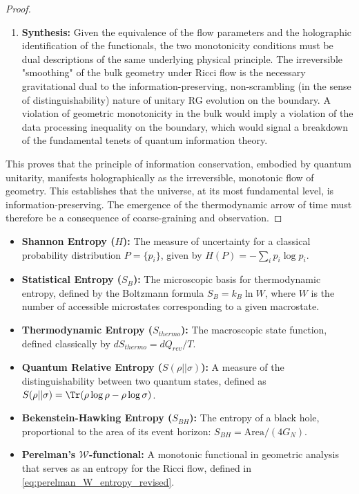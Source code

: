 \documentclass[11pt, letterpaper]{report}
\theoremstyle{plain} %
\theoremstyle{definition} %
\theoremstyle{remark} %
\begin{document}
\begin{proof}
\begin{enumerate}
    \item \textbf{Synthesis:} Given the equivalence of the flow parameters and the holographic identification of the functionals, the two monotonicity conditions must be dual descriptions of the same underlying physical principle. The irreversible "smoothing" of the bulk geometry under Ricci flow is the necessary gravitational dual to the information-preserving, non-scrambling (in the sense of distinguishability) nature of unitary RG evolution on the boundary. A violation of geometric monotonicity in the bulk would imply a violation of the data processing inequality on the boundary, which would signal a breakdown of the fundamental tenets of quantum information theory.
\end{enumerate}
This proves that the principle of information conservation, embodied by quantum unitarity, manifests holographically as the irreversible, monotonic flow of geometry. This establishes that the universe, at its most fundamental level, is information-preserving. The emergence of the thermodynamic arrow of time must therefore be a consequence of coarse-graining and observation.
\end{proof}
\begin{itemize}
    \item \textbf{Shannon Entropy ($H$):} The measure of uncertainty for a classical probability distribution $P = \{p_i\}$, given by $H(P) = -\sum_i p_i \log p_i$.
    \item \textbf{Statistical Entropy ($S_B$):} The microscopic basis for thermodynamic entropy, defined by the Boltzmann formula $S_B = k_B \ln W$, where $W$ is the number of accessible microstates corresponding to a given macrostate.
    \item \textbf{Thermodynamic Entropy ($S_{thermo}$):} The macroscopic state function, defined classically by $dS_{thermo} = dQ_{rev}/T$.
    \item \textbf{Quantum Relative Entropy ($S(\rho||\sigma)$):} A measure of the distinguishability between two quantum states, defined as $S(\rho||\sigma) = \Tr(\rho \log \rho - \rho \log \sigma)$.
    \item \textbf{Bekenstein-Hawking Entropy ($S_{BH}$):} The entropy of a black hole, proportional to the area of its event horizon: $S_{BH} = \text{Area}/(4G_N)$.
    \item \textbf{Perelman's $\mathcal{W}$-functional:} A monotonic functional in geometric analysis that serves as an entropy for the Ricci flow, defined in \cref{eq:perelman_W_entropy_revised}.
\end{itemize}
\end{document}
